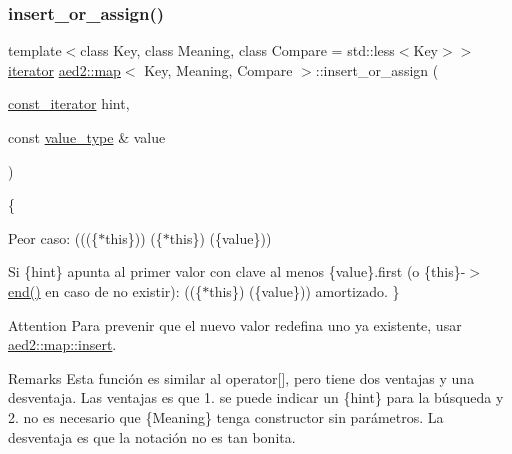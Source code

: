 \subsubsection{\texorpdfstring{insert\+\_\+or\+\_\+assign()}{insert\_or\_assign()}\hspace{0.1cm}{\footnotesize\ttfamily [2/4]}}
{\footnotesize\ttfamily template$<$class Key, class Meaning, class Compare = std\+::less$<$\+Key$>$$>$ \\
\hyperlink{classaed2_1_1map_1_1iterator}{iterator} \hyperlink{classaed2_1_1map}{aed2\+::map}$<$ Key, Meaning, Compare $>$\+::insert\+\_\+or\+\_\+assign (\begin{DoxyParamCaption}\item[{\hyperlink{classaed2_1_1map_1_1const__iterator}{const\+\_\+iterator}}]{hint,  }\item[{const \hyperlink{classaed2_1_1map_a719db98e0ff9a837610f76be33264680}{value\+\_\+type} \&}]{value }\end{DoxyParamCaption})\hspace{0.3cm}{\ttfamily [inline]}}

\{
\begin{DoxyItemize}
\item Peor caso\+: (((\{$\ast$this\}))  (\{$\ast$this\})  (\{value\}))
\item Si \{hint\} apunta al primer valor con clave al menos \{value\}.first (o \{this\}-\/$>$\hyperlink{classaed2_1_1map_a76023e6a56cb625513e1b5ea028bf983}{end()} en caso de no existir)\+: ((\{$\ast$this\})  (\{value\})) amortizado. \}
\end{DoxyItemize}

\begin{DoxyAttention}{Attention}
Para prevenir que el nuevo valor redefina uno ya existente, usar \hyperlink{classaed2_1_1map_a6941cde9a79c27f054b5c97a587a1854}{aed2\+::map\+::insert}. 
\end{DoxyAttention}
\begin{DoxyRemark}{Remarks}
Esta función es similar al operator\mbox{[}\mbox{]}, pero tiene dos ventajas y una desventaja. Las ventajas es que 1. se puede indicar un \{hint\} para la búsqueda y 2. no es necesario que \{Meaning\} tenga constructor sin parámetros. La desventaja es que la notación no es tan bonita. 
\end{DoxyRemark}
\mbox{\label{classaed2_1_1map_a9128a806713bcc999ebd8a97ab77e765}} 
